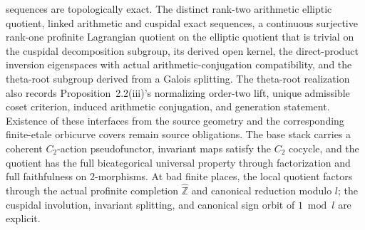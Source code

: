 \begin{definition}
  sequences are topologically exact.  The distinct rank-two arithmetic
  elliptic quotient, linked arithmetic and cuspidal exact sequences, a
  continuous surjective rank-one profinite Lagrangian quotient on the elliptic
  quotient that is trivial on the cuspidal decomposition subgroup, its derived
  open kernel, the direct-product inversion eigenspaces
  with actual arithmetic-conjugation compatibility, and the theta-root
  subgroup derived from a Galois splitting.  The theta-root realization also
  records Proposition~2.2(iii)'s normalizing order-two lift, unique admissible
  coset criterion, induced arithmetic conjugation, and generation statement.
  Existence of these interfaces from the source geometry and the
  corresponding finite-etale orbicurve covers remain source obligations.  The
  base stack carries a coherent \(C_2\)-action pseudofunctor, invariant maps
  satisfy the \(C_2\) cocycle, and the quotient has the full bicategorical
  universal property through factorization and full faithfulness on
  2-morphisms.  At bad
  finite places, the local quotient factors through the actual profinite
  completion \(\widehat{\mathbb Z}\) and canonical reduction modulo \(l\);
  the cuspidal involution, invariant splitting, and canonical sign orbit of
  \(1\bmod l\) are explicit.
\end{definition}

